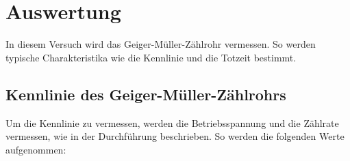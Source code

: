 %

%

\section{Auswertung}
\label{sec:Auswertung}

In diesem Versuch wird das Geiger-Müller-Zählrohr vermessen. So werden typische Charakteristika wie die Kennlinie und 
die Totzeit bestimmt.

\subsection{Kennlinie des Geiger-Müller-Zählrohrs}
Um die Kennlinie zu vermessen, werden die Betriebsspannung und die Zählrate vermessen, wie in der Durchführung 
beschrieben. So werden die folgenden Werte aufgenommen:

